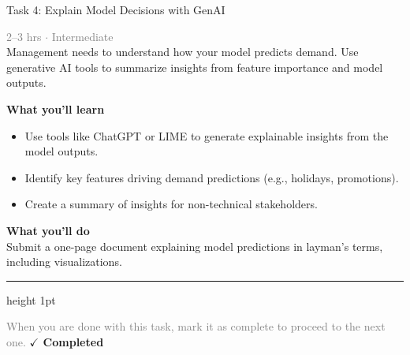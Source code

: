 \documentclass[10pt,a4paper]{article}
\begin{document}
\begin{taskbox}{Task 4: Explain Model Decisions with GenAI}

    {\small \textcolor{gray}{2--3 hrs $\cdot$ Intermediate}}\\[12pt]

      
Management needs to understand how your model predicts demand. Use generative AI tools to summarize insights from feature importance and model outputs.  


\vspace{8pt}
{\large \textbf{\textcolor{brandLight}{What you'll learn}}}\\[4pt]  
\begin{itemize}
    \item Use tools like ChatGPT or LIME to generate explainable insights from the model outputs.  
    \item Identify key features driving demand predictions (e.g., holidays, promotions).  
    \item Create a summary of insights for non-technical stakeholders.  
\end{itemize}

\vspace{8pt}
{\large \textbf{\textcolor{brandLight}{What you'll do}}}\\[4pt]  
Submit a one-page document explaining model predictions in layman’s terms, including visualizations.\par

    \vspace{16pt}

    \textcolor{cardBorder}{\hrule height 1pt}\vspace{8pt}

    \small \textcolor{gray}{When you are done with this task, mark it as complete to proceed to the next one.} \hfill \textbf{\textcolor{brandDark}{$\checkmark$ Completed}}

\end{taskbox}
\end{document}
